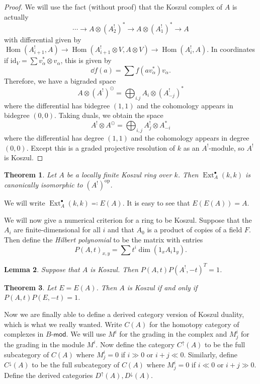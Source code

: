 \documentclass[leqno, openany]{memoir}
\newtheorem{thm}{Theorem}[section]
\newtheorem{lem}[thm]{Lemma}
\theoremstyle{definition}
\theoremstyle{remark}
\theoremstyle{plain}
\theoremstyle{definition}
\theoremstyle{remark}
\newcommand{\mr}[1]{\mathrm{#1}}
\newcommand{\ms}[1]{\mathsf{#1}}
\DeclareMathOperator{\Hom}{Hom}
\DeclareMathOperator{\Ext}{Ext}
\begin{document}
\begin{proof}
    We will use the fact (without proof) that the Koszul complex of $A$ is actually
    \[ \cdots \to A \otimes (A_2^!)^* \to A \otimes (A_1^!)^* \to A \]
    with differential given by $\Hom(A_{i+1}^!, A) \to \Hom(A_{i+1}^! \otimes V, A \otimes V) \to \Hom(A_i^!, A)$. 
    In coordinates if $\mr{id}_V = \sum v_{\alpha}^* \otimes v_{\alpha}$, this is given by
    \[ \dd{f}(a) = \sum f(a v_{\alpha}^*) v_{\alpha}. \]
    Therefore, we have a bigraded space
    \[ A \otimes (A^!)^{\odot} = \bigoplus_{i.j} A_i \otimes (A_{-j}^!)^* \]
    where the differential has bidegree $(1,1)$ and the cohomology appears in bidegree $(0,0)$. Taking duals, we obtain the space
    \[ A^! \otimes A^{\odot} = \bigoplus_{i,j} A_j^! \otimes A_{-i}^* \]
    where the differential has degree $(1,1)$ and the cohomology appears in degree $(0,0)$. Except this is a graded projective resolution of $k$ as an $A^!$-module, so $A^!$ is Koszul.
\end{proof}

\begin{thm}
    Let $A$ be a locally finite Koszul ring over $k$. Then $\Ext_A^{\bullet}(k, k)$ is canonically isomorphic to $(A^!)^{\mr{op}}$.
\end{thm}
We will write $\Ext_A^{\bullet}(k, k) \eqqcolon E(A)$. It is easy to see that $E(E(A)) = A$. 

We will now give a numerical criterion for a ring to be Koszul. Suppose that the $A_i$ are finite-dimensional for all $i$ and that $A_0$ is a product of copies of a field $F$. Then define the \textit{Hilbert polynomial} to be the matrix with entries
\[ P(A, t)_{x,y} = \sum t^i \dim (1_x A_i 1_y). \]

\begin{lem}
    Suppose that $A$ is Koszul. Then $P(A,t)P(A^!, -t)^T = 1$.
\end{lem}

\begin{thm}
    Let $E = E(A)$. Then $A$ is Koszul if and only if $P(A, t)P(E, -t) = 1$.
\end{thm}

Now we are finally able to define a derived category version of Koszul duality, which is what we really wanted. Write $C(A)$ for the homotopy category of complexes in $B\text{-}\ms{mod}$. We will use $M^i$ for the grading in the complex and $M^i_j$ for the grading in the module $M^i$. Now define the category $C^{\uparrow}(A)$ to be the full subcategory of $C(A)$ where $M_j^i = 0$ if $i \gg 0$ or $i + j \ll 0$. Similarly, define $C^{\downarrow}(A)$ to be the full subcategory of $C(A)$ where $M_j^i = 0$ if $i \ll 0$ or $i + j \gg 0$. Define the derived categories $D^{\uparrow}(A), D^{\downarrow}(A)$.
\end{document}
